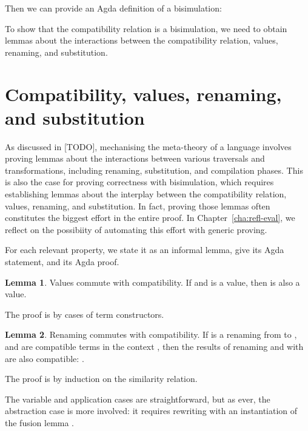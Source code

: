 \documentclass[bsc,frontabs,oneside,singlespacing,parskip,deptreport]{infthesis}
\theoremstyle{definition}
\theoremstyle{lemma}
\newtheorem*{lemma}{Lemma}
\begin{document}
Then we can provide an Agda definition of a bisimulation:


To show that the compatibility relation is a bisimulation, we need to
obtain lemmas about the interactions between the compatibility
relation, values, renaming, and substitution.

\section{Compatibility, values, renaming, and substitution}
\label{sec:comp-valu-renam}

As discussed in [TODO], mechanising the meta-theory of a language
involves proving lemmas about the interactions between various
traversals and transformations, including renaming, substitution, and
compilation phases. This is also the case for proving correctness with
bisimulation, which requires establishing lemmas about the interplay
between the compatibility relation, values, renaming, and
substitution. In fact, proving those lemmas often constitutes the
biggest effort in the entire proof. In Chapter~\ref{cha:refl-eval}, we
reflect on the possibiity of automating this effort with generic
proving.

For each relevant property, we state it as an informal lemma, give its
Agda statement, and its Agda proof.

\begin{lemma}{Values commute with compatibility.}
  If  and  is a value, then  is also a
  value.
\end{lemma}

The proof is by cases of term constructors.


\begin{lemma}{Renaming commutes with compatibility.}
  If  is a renaming from  to , and  are
  compatible terms in the context , then the results of renaming
   and  with  are also compatible: .
\end{lemma}

The proof is by induction on the similarity relation.


The variable and application cases are straightforward, but as ever, the
abstraction case is more involved: it requires rewriting with an
instantiation of the fusion lemma .
\end{document}
